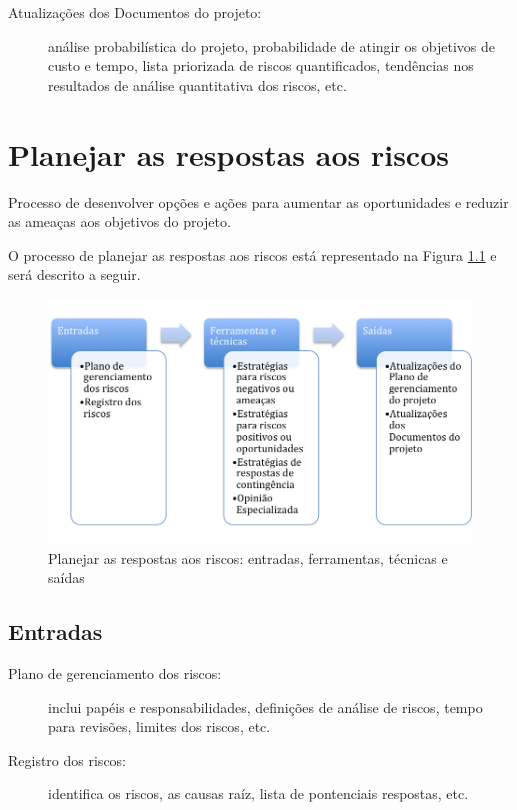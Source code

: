 \begin{description}
	
	\item[Atualizações dos Documentos do projeto:] análise probabilística do projeto, probabilidade de atingir os objetivos de custo e tempo, lista priorizada de riscos quantificados, tendências nos resultados de análise quantitativa dos riscos, etc.	
	
\end{description}


\chapter{Planejar as respostas aos riscos}

Processo de desenvolver opções e ações para aumentar as oportunidades e reduzir as ameaças aos objetivos do projeto.

O processo de planejar as respostas aos riscos está representado na Figura \ref{fig:riscos:resp:efts} e será descrito a seguir.

\begin{figure}[!h]
	\centering
	\includegraphics[scale=0.5]{Figuras/riscos_efts_resp.png}
	\caption{Planejar as respostas aos riscos: entradas, ferramentas, técnicas e saídas}
	\label{fig:riscos:resp:efts}
\end{figure}

\section{Entradas}

\begin{description}
	
	\item[Plano de gerenciamento dos riscos:] inclui papéis e responsabilidades, definições de análise de riscos, tempo para revisões, limites dos riscos, etc.
	
	\item[Registro dos riscos:] identifica os riscos, as causas raíz, lista de pontenciais respostas, etc.
	
\end{description}

